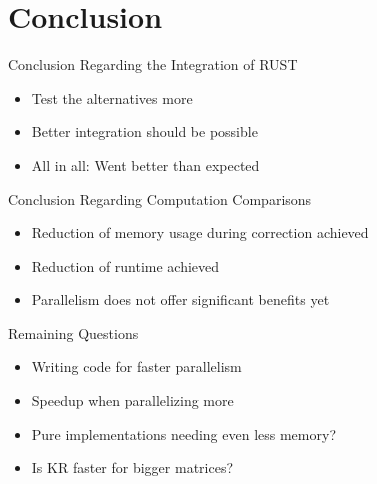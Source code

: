 \section{Conclusion}


\begin{frame}[c]{Conclusion Regarding the Integration of RUST}
    \begin{itemize}[<+(1)->]
        \item Test the alternatives more
        \item Better integration should be possible
        \item All in all: Went better than expected
    \end{itemize}
\end{frame}


\begin{frame}[c]{Conclusion Regarding Computation Comparisons}
    \begin{itemize}[<+(1)->]
        \item Reduction of memory usage during correction achieved
        \item Reduction of runtime achieved
        \item Parallelism does not offer significant benefits yet
    \end{itemize}
\end{frame}


\begin{frame}[c]{Remaining Questions}
    \begin{itemize}[<+(1)->]
        \item Writing code for faster parallelism
        \item Speedup when parallelizing more
        \item Pure implementations needing even less memory?
        \item Is KR faster for bigger matrices?
    \end{itemize}
\end{frame}



